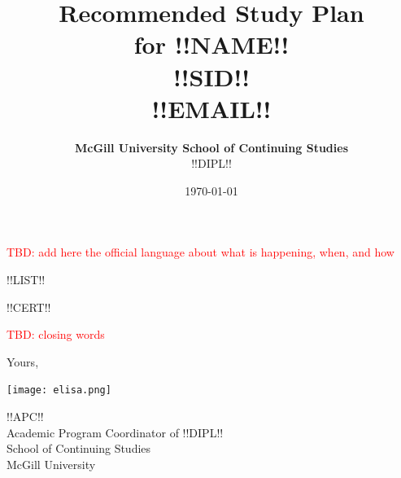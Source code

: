 \documentclass{article}
\title{Recommended Study Plan \\ for {\bf !!NAME!!} \\ {\small !!SID!! \\ !!EMAIL!! } }
\date{\today}
\author{{\bf McGill University School of Continuing Studies} \\
  !!DIPL!!}
\begin{document}
\maketitle

\thispagestyle{fancy}

\textcolor{red}{TBD: add here the official language about what is happening, when, and how}

!!LIST!!

!!CERT!!

\newpage

\textcolor{red}{TBD: closing words}

Yours,

\hspace*{3mm}\texttt{[image: elisa.png]}

\vspace*{-7mm}
!!APC!! \\
Academic Program Coordinator of !!DIPL!! \\
School of Continuing Studies \\
McGill University

\label{LastPage}
\end{document}
